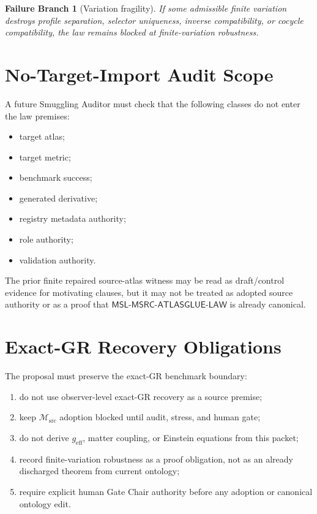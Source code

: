 \documentclass[11pt]{article}
\newcommand{\Msrc}{\mathcal{M}_{\mathrm{src}}}
\newcommand{\geff}{g_{\mathrm{eff}}}
\newcommand{\MSL}{\mathsf{MSL}\mbox{-}\mathsf{MSRC}\mbox{-}\mathsf{ATLASGLUE}\mbox{-}\mathsf{LAW}}
\newtheorem{failure}{Failure Branch}
\begin{document}
\begin{failure}[Variation fragility]
If some admissible finite variation destroys profile separation, selector
uniqueness, inverse compatibility, or cocycle compatibility, the law remains
blocked at finite-variation robustness.
\end{failure}

\section{No-Target-Import Audit Scope}

A future Smuggling Auditor must check that the following classes do not enter
the law premises:
\begin{itemize}
  \item target atlas;
  \item target metric;
  \item benchmark success;
  \item generated derivative;
  \item registry metadata authority;
  \item role authority;
  \item validation authority.
\end{itemize}

The prior finite repaired source-atlas witness may be read as draft/control
evidence for motivating clauses, but it may not be treated as adopted source
authority or as a proof that \(\MSL\) is already canonical.

\section{Exact-GR Recovery Obligations}

The proposal must preserve the exact-GR benchmark boundary:
\begin{enumerate}
  \item do not use observer-level exact-GR recovery as a source premise;
  \item keep \(\Msrc\) adoption blocked until audit, stress, and human gate;
  \item do not derive \(\geff\), matter coupling, or Einstein equations from
  this packet;
  \item record finite-variation robustness as a proof obligation, not as an
  already discharged theorem from current ontology;
  \item require explicit human Gate Chair authority before any adoption or
  canonical ontology edit.
\end{enumerate}
\end{document}
